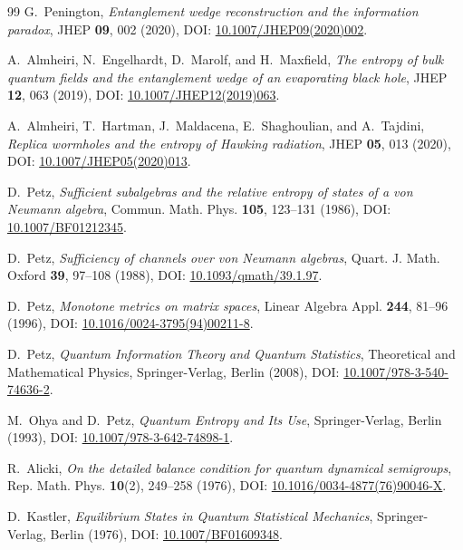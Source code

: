 \documentclass[11pt,a4paper]{article}
\theoremstyle{plain}
\theoremstyle{definition}
\begin{document}
\begin{thebibliography}{99}
G.~Penington, \textit{Entanglement wedge reconstruction and the information paradox}, JHEP \textbf{09}, 002 (2020), DOI: \href{https://doi.org/10.1007/JHEP09(2020)002}{10.1007/JHEP09(2020)002}.

A.~Almheiri, N.~Engelhardt, D.~Marolf, and H.~Maxfield, \textit{The entropy of bulk quantum fields and the entanglement wedge of an evaporating black hole}, JHEP \textbf{12}, 063 (2019), DOI: \href{https://doi.org/10.1007/JHEP12(2019)063}{10.1007/JHEP12(2019)063}.

A.~Almheiri, T.~Hartman, J.~Maldacena, E.~Shaghoulian, and A.~Tajdini, \textit{Replica wormholes and the entropy of Hawking radiation}, JHEP \textbf{05}, 013 (2020), DOI: \href{https://doi.org/10.1007/JHEP05(2020)013}{10.1007/JHEP05(2020)013}.

D.~Petz, \textit{Sufficient subalgebras and the relative entropy of states of a von Neumann algebra}, Commun. Math. Phys. \textbf{105}, 123--131 (1986), DOI: \href{https://doi.org/10.1007/BF01212345}{10.1007/BF01212345}.

D.~Petz, \textit{Sufficiency of channels over von Neumann algebras}, Quart. J. Math. Oxford \textbf{39}, 97--108 (1988), DOI: \href{https://doi.org/10.1093/qmath/39.1.97}{10.1093/qmath/39.1.97}.

D.~Petz, \textit{Monotone metrics on matrix spaces}, Linear Algebra Appl. \textbf{244}, 81--96 (1996), DOI: \href{https://doi.org/10.1016/0024-3795(94)00211-8}{10.1016/0024-3795(94)00211-8}.

D.~Petz, \textit{Quantum Information Theory and Quantum Statistics}, Theoretical and Mathematical Physics, Springer-Verlag, Berlin (2008), DOI: \href{https://doi.org/10.1007/978-3-540-74636-2}{10.1007/978-3-540-74636-2}.

M.~Ohya and D.~Petz, \textit{Quantum Entropy and Its Use}, Springer-Verlag, Berlin (1993), DOI: \href{https://doi.org/10.1007/978-3-642-74898-1}{10.1007/978-3-642-74898-1}.

R.~Alicki, \textit{On the detailed balance condition for quantum dynamical semigroups}, Rep. Math. Phys. \textbf{10}(2), 249--258 (1976), DOI: \href{https://doi.org/10.1016/0034-4877(76)90046-X}{10.1016/0034-4877(76)90046-X}.

D.~Kastler, \textit{Equilibrium States in Quantum Statistical Mechanics}, Springer-Verlag, Berlin (1976), DOI: \href{https://doi.org/10.1007/BF01609348}{10.1007/BF01609348}.


\end{thebibliography}
\end{document}
